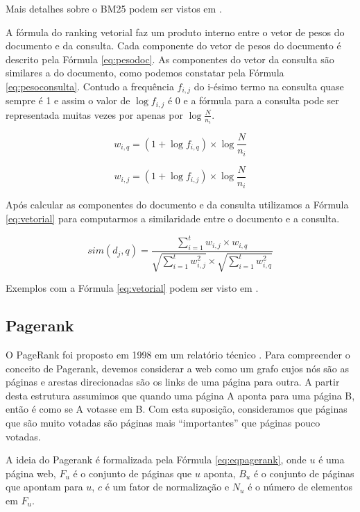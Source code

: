 \documentclass[a4paper]{article}
\begin{document}
Mais detalhes sobre o BM25 podem ser vistos em \cite{Baeza1999}.

A fórmula do ranking vetorial faz um produto interno entre o vetor de pesos do documento e 
da consulta. Cada componente do vetor de pesos do documento é descrito pela Fórmula \ref{eq:pesodoc}. 
As componentes do vetor da consulta são similares a do documento, como podemos 
constatar pela Fórmula \ref{eq:pesoconsulta}. Contudo a frequência $f_{i,j}$ do i-ésimo 
termo na consulta quase sempre 
é 1 e assim o valor de $\log f_{i,j}$ é 0 e a fórmula para a consulta pode 
ser representada muitas vezes por apenas por $\log{\frac{N}{n_i}}$.

\begin{equation}
    w_{i,q} = (1+\log{f_{i,q}}) \times \log{\frac{N}{n_i}}
    \label{eq:pesoconsulta}
\end{equation}

\begin{equation}
    w_{i,j} = (1+\log{f_{i,j}}) \times \log{\frac{N}{n_i}}
    \label{eq:pesodoc}
\end{equation}

Após calcular as componentes do documento e da consulta utilizamos a Fórmula \ref{eq:vetorial} para 
computarmos a similaridade entre o documento e a consulta.

\begin{equation}
    sim(d_j,q) = \frac{\sum^t_{i=1} w_{i,j} \times w_{i,q}}{\sqrt{\sum^t_{i=1} w_{i,j}^2}\times \sqrt{\sum^t_{i=1}w^2_{i,q}}}
    \label{eq:vetorial}
\end{equation}

Exemplos com a Fórmula \ref{eq:vetorial} podem ser visto em \cite{Baeza1999}.

\subsection{Pagerank}\label{sec:pagerank}

O PageRank foi proposto em 1998 em um relatório técnico \cite{page1999pagerank}. 
Para compreender o conceito de Pagerank, devemos considerar a web como um grafo cujos 
nós são as páginas e arestas direcionadas são os links de uma página para outra. A partir 
desta estrutura assumimos que quando uma página A aponta para uma página B, então é como se A votasse em B. 
Com esta suposição, consideramos que páginas que são muito votadas são páginas mais 
``importantes'' que páginas pouco votadas.

A ideia do Pagerank é formalizada pela Fórmula \ref{eq:eqpagerank}, onde $u$ é 
uma página web, $F_u$ 
é o conjunto de páginas que $u$ aponta, $B_u$ é o conjunto de páginas que apontam 
para $u$, $c$ é um fator de normalização e $N_u$ é o número de elementos em $F_u$.
\end{document}
